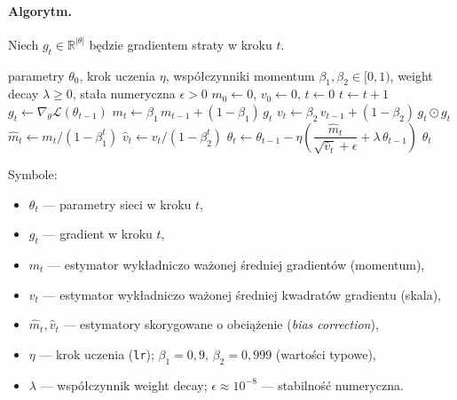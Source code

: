 \documentclass[12pt,a4paper]{article}
\begin{document}
\paragraph{Algorytm.}
Niech $g_t \in \mathbb{R}^{|\theta|}$ będzie gradientem straty w kroku $t$.

\begin{algorithm}[H]
\caption{AdamW (Decoupled Weight Decay) --- \citep{loshchilov2019adamw}}
\label{alg:adamw}
\begin{algorithmic}[1]
\Require parametry $\theta_0$, krok uczenia $\eta$, współczynniki momentum $\beta_1, \beta_2 \in [0,1)$, weight decay $\lambda \ge 0$, stała numeryczna $\epsilon > 0$
\State $m_0 \gets 0$, $v_0 \gets 0$, $t \gets 0$
    \State $t \gets t + 1$
    \State $g_t \gets \nabla_\theta \mathcal{L}(\theta_{t-1})$ 
    \State $m_t \gets \beta_1\, m_{t-1} + (1 - \beta_1)\, g_t$ 
    \State $v_t \gets \beta_2\, v_{t-1} + (1 - \beta_2)\, g_t \odot g_t$ 
    \State $\hat m_t \gets m_t / (1 - \beta_1^t)$ 
    \State $\hat v_t \gets v_t / (1 - \beta_2^t)$
    \State $\theta_t \gets \theta_{t-1} - \eta\!\left( \dfrac{\hat m_t}{\sqrt{\hat v_t} + \epsilon} + \lambda\, \theta_{t-1} \right)$ 
\EndWhile
\State \Return $\theta_t$
\end{algorithmic}
\end{algorithm}

Symbole:
\begin{itemize}[leftmargin=1.5em]
    \item $\theta_t$ --- parametry sieci w kroku $t$,
    \item $g_t$ --- gradient w kroku $t$,
    \item $m_t$ --- estymator wykładniczo ważonej średniej gradientów (momentum),
    \item $v_t$ --- estymator wykładniczo ważonej średniej kwadratów gradientu (skala),
    \item $\hat m_t, \hat v_t$ --- estymatory skorygowane o obciążenie (\emph{bias correction}),
    \item $\eta$ --- krok uczenia (\texttt{lr}); $\beta_1 = 0{,}9$, $\beta_2 = 0{,}999$ (wartości typowe),
    \item $\lambda$ --- współczynnik weight decay; $\epsilon \approx 10^{-8}$ --- stabilność numeryczna.
\end{itemize}
\end{document}
